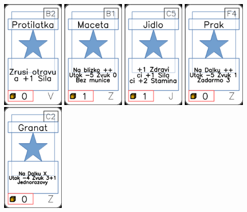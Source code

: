 \documentclass[a4paper]{article}
\begin{document}
	\includegraphics[width=3.0cm]{img-1_66}
	\includegraphics[width=3.0cm]{img-1_95}
	\includegraphics[width=3.0cm]{img-1_14}
	\includegraphics[width=3.0cm]{img-1_88}
	\includegraphics[width=3.0cm]{img-1_101}
\end{document}
